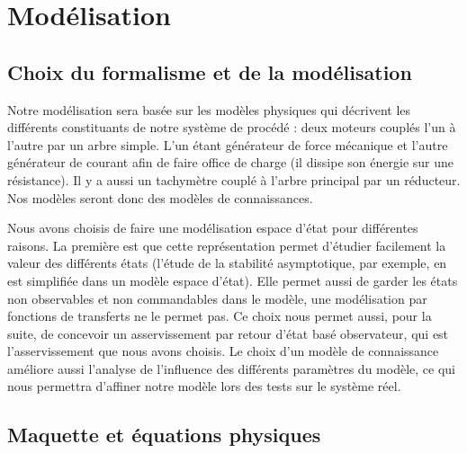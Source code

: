 \chapter{Modélisation\label{chap:modelisation}}


\section{Choix du formalisme et de la modélisation}
Notre modélisation sera basée sur les modèles physiques qui décrivent les différents constituants de notre système de procédé : deux moteurs couplés l'un à l'autre par un arbre simple. L'un étant générateur de force mécanique et l'autre générateur de courant afin de faire office de charge (il dissipe son énergie sur une résistance). Il y a aussi un tachymètre couplé à l'arbre principal par un réducteur.
Nos modèles seront donc des modèles de connaissances.

Nous avons choisis de faire une modélisation espace d'état pour différentes raisons. La première est que cette représentation permet d'étudier facilement la valeur des différents états (l'étude de la stabilité asymptotique, par exemple, en est simplifiée dans un modèle espace d'état). Elle permet aussi de garder les états non observables et non commandables dans le modèle, une modélisation par fonctions de transferts ne le permet pas. Ce choix nous permet aussi, pour la suite, de concevoir un asservissement par retour d'état basé observateur, qui est l'asservissement que nous avons choisis. Le choix d'un modèle de connaissance améliore aussi l'analyse de l'influence des différents paramètres du modèle, ce qui nous permettra d'affiner notre modèle lors des tests sur le système réel. 



\section{Maquette et équations physiques}
